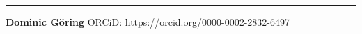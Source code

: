 \begin{center}\rule{0.5\linewidth}{0.5pt}\end{center}

\textbf{Dominic Göring} ORCiD:
\url{https://orcid.org/0000-0002-2832-6497}

